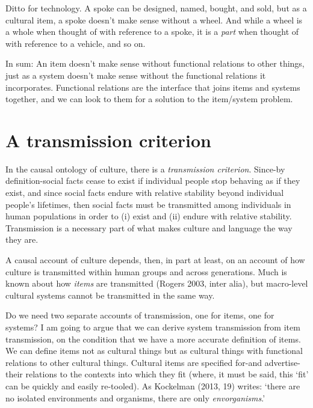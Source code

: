 Ditto for technology. A spoke can be designed, named, bought, and sold, 
but as a cultural item, a spoke doesn't make sense without a wheel. And 
while a wheel is a whole when thought of with reference to a spoke, it 
is a \textit{part} when thought of with reference to a vehicle, and so 
on. 



In sum: An item doesn't make sense without functional relations to other 
things, just as a system doesn't make sense without the functional 
relations it incorporates. Functional relations are the interface that 
joins items and systems together, and we can look to them for a solution 
to the item/system problem.

\section{A transmission criterion}


In the causal ontology of culture, there is a \textit{transmission 
criterion}. Since-by definition-social facts cease to exist if 
individual people stop behaving as if they exist, and since social facts 
endure with relative stability beyond individual people's lifetimes, 
then social facts must be transmitted among individuals in human 
populations in order to (i) exist and (ii) endure with relative 
stability. Transmission is a necessary part of what makes culture and 
language the way they are. 



A causal account of culture depends, then, in part at least, on an 
account of how culture is transmitted within human groups and across 
generations. Much is known about how \textit{items} are transmitted 
(Rogers 2003, inter alia), but macro-level cultural systems cannot be 
transmitted in the same way. 



Do we need two separate accounts of transmission, one for items, one for 
systems? I am going to argue that we can derive system transmission from 
item transmission, on the condition that we have a more accurate 
definition of items. We can define items not as cultural things but as 
cultural things with functional relations to other cultural things. 
Cultural items are specified for-and advertise-their relations to the 
contexts into which they fit (where, it must be said, this \textquoteleft fit' can be 
quickly and easily re-tooled). As Kockelman (2013, 19) writes: \textquoteleft there 
are no isolated environments and organisms, there are only \textit{
envorganisms}.' 

